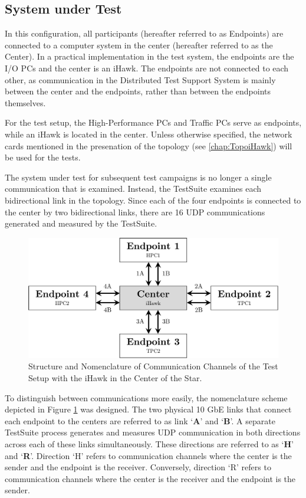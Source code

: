 \subsection{System under Test} \label{chap:ReliabIhawk:SuT}
In this configuration, all participants (hereafter referred to as Endpoints) are connected to a computer system in the center (hereafter referred to as the Center). In a practical implementation in the test system, the endpoints are the I/O PCs and the center is an iHawk. The endpoints are not connected to each other, as communication in the Distributed Test Support System is mainly between the center and the endpoints, rather than between the endpoints themselves.

For the test setup, the High-Performance PCs and Traffic PCs serve as endpoints, while an iHawk is located in the center. Unless otherwise specified, the network cards mentioned in the presenation of the topology (see \ref{chap:TopoiHawk}) will be used for the tests.

The system under test for subsequent test campaigns is no longer a single communication that is examined. Instead, the TestSuite examines each bidirectional link in the topology. Since each of the four endpoints is connected to the center by two bidirectional links, there are 16 UDP communications generated and measured by the TestSuite.

\begin{figure}[h!]
    \centering
    \includegraphics[width=0.8\linewidth]{figures/reliability/ihawk/topo.pdf}
    \caption{Structure and Nomenclature of Communication Channels of the Test Setup with the iHawk in the Center of the Star.}
    \label{fig:topoihawknaming}
\end{figure}

To distinguish between communications more easily, the nomenclature scheme depicted in Figure \ref{fig:topoihawknaming} was designed. The two physical 10 GbE links that connect each endpoint to the centers are referred to as link `\textbf{A}' and `\textbf{B}'. A separate TestSuite process generates and measures UDP communication in both directions across each of these links simultaneously. These directions are referred to as `\textbf{H}' and `\textbf{R}'. Direction `H' refers to communication channels where the center is the sender and the endpoint is the receiver. Conversely, direction `R' refers to communication channels where the center is the receiver and the endpoint is the sender.

